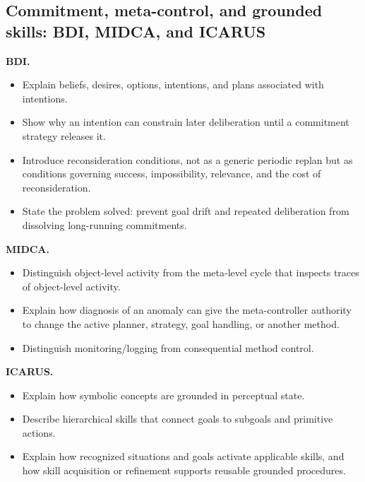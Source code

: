 \subsection{Commitment, meta-control, and grounded skills: BDI, MIDCA, and ICARUS}
\textbf{BDI.}
\begin{itemize}
  \item Explain beliefs, desires, options, intentions, and plans associated with intentions.
  \item Show why an intention can constrain later deliberation until a commitment strategy releases it.
  \item Introduce reconsideration conditions, not as a generic periodic replan but as conditions governing success, impossibility, relevance, and the cost of reconsideration.
  \item State the problem solved: prevent goal drift and repeated deliberation from dissolving long-running commitments.
\end{itemize}
\textbf{MIDCA.}
\begin{itemize}
  \item Distinguish object-level activity from the meta-level cycle that inspects traces of object-level activity.
  \item Explain how diagnosis of an anomaly can give the meta-controller authority to change the active planner, strategy, goal handling, or another method.
  \item Distinguish monitoring/logging from consequential method control.
\end{itemize}
\textbf{ICARUS.}
\begin{itemize}
  \item Explain how symbolic concepts are grounded in perceptual state.
  \item Describe hierarchical skills that connect goals to subgoals and primitive actions.
  \item Explain how recognized situations and goals activate applicable skills, and how skill acquisition or refinement supports reusable grounded procedures.
\end{itemize}

